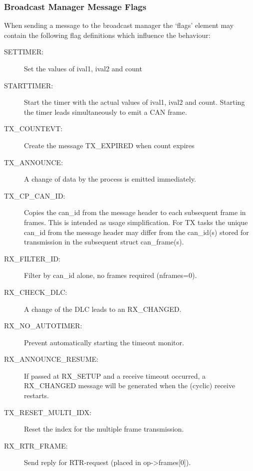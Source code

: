 \documentclass[a4paper,8pt,english]{sphinxmanual}
\begin{document}
\subsubsection{Broadcast Manager Message Flags}
\label{networking/can:broadcast-manager-message-flags}
When sending a message to the broadcast manager the `flags' element may
contain the following flag definitions which influence the behaviour:
\begin{description}
\item[{SETTIMER:}] \leavevmode
Set the values of ival1, ival2 and count

\item[{STARTTIMER:}] \leavevmode
Start the timer with the actual values of ival1, ival2
and count. Starting the timer leads simultaneously to emit a CAN frame.

\item[{TX\_COUNTEVT:}] \leavevmode
Create the message TX\_EXPIRED when count expires

\item[{TX\_ANNOUNCE:}] \leavevmode
A change of data by the process is emitted immediately.

\item[{TX\_CP\_CAN\_ID:}] \leavevmode
Copies the can\_id from the message header to each
subsequent frame in frames. This is intended as usage simplification. For
TX tasks the unique can\_id from the message header may differ from the
can\_id(s) stored for transmission in the subsequent struct can\_frame(s).

\item[{RX\_FILTER\_ID:}] \leavevmode
Filter by can\_id alone, no frames required (nframes=0).

\item[{RX\_CHECK\_DLC:}] \leavevmode
A change of the DLC leads to an RX\_CHANGED.

\item[{RX\_NO\_AUTOTIMER:}] \leavevmode
Prevent automatically starting the timeout monitor.

\item[{RX\_ANNOUNCE\_RESUME:}] \leavevmode
If passed at RX\_SETUP and a receive timeout occurred, a
RX\_CHANGED message will be generated when the (cyclic) receive restarts.

\item[{TX\_RESET\_MULTI\_IDX:}] \leavevmode
Reset the index for the multiple frame transmission.

\item[{RX\_RTR\_FRAME:}] \leavevmode
Send reply for RTR-request (placed in op-\textgreater{}frames{[}0{]}).

\end{description}
\end{document}
